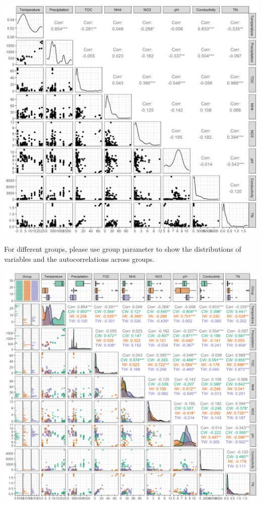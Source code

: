 \documentclass[
]{book}
\newenvironment{Shaded}{\begin{snugshade}}{\end{snugshade}}
\newcommand{\AttributeTok}[1]{\textcolor[rgb]{0.77,0.63,0.00}{#1}}
\newcommand{\FunctionTok}[1]{\textcolor[rgb]{0.00,0.00,0.00}{#1}}
\newcommand{\NormalTok}[1]{#1}
\newcommand{\SpecialCharTok}[1]{\textcolor[rgb]{0.00,0.00,0.00}{#1}}
\newcommand{\StringTok}[1]{\textcolor[rgb]{0.31,0.60,0.02}{#1}}
\begin{document}
\begin{center}\includegraphics[width=800px]{Images/trans_env_autocor1} \end{center}

For different groups, please use group parameter to show the distributions of variables and the autocorrelations across groups.

\begin{Shaded}
\end{Shaded}

\begin{center}\includegraphics[width=800px]{Images/trans_env_autocor_group} \end{center}
\end{document}
